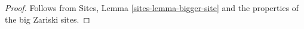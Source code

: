 \begin{proof}
Follows from Sites, Lemma \ref{sites-lemma-bigger-site} and the properties of
the big Zariski sites.
\end{proof}











